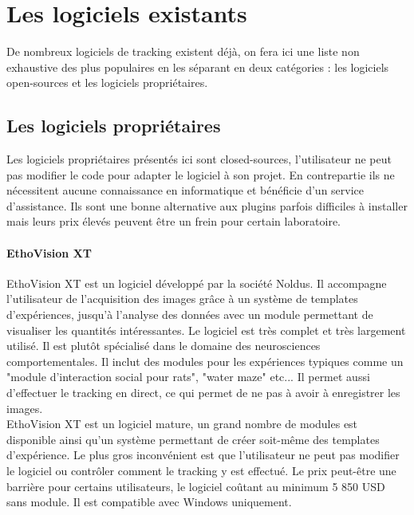 	\section{Les logiciels existants}
  De nombreux logiciels de tracking existent déjà, on fera ici une liste non exhaustive des plus populaires en les séparant en deux catégories : les logiciels open-sources et les logiciels propriétaires.

  \subsection{Les logiciels propriétaires}
  Les logiciels propriétaires présentés ici sont closed-sources, l'utilisateur ne peut pas modifier le code pour adapter le logiciel à son projet. En contrepartie ils ne nécessitent aucune connaissance en informatique et bénéficie d'un service d'assistance. Ils sont une bonne alternative aux plugins parfois difficiles à installer mais leurs prix élevés peuvent être un frein pour certain laboratoire.
  
  \paragraph{EthoVision XT}
  EthoVision XT est un logiciel développé par la société Noldus. Il accompagne l'utilisateur de l'acquisition des images grâce à un système de templates d'expériences, jusqu'à l'analyse des données avec un module permettant de visualiser les quantités intéressantes. Le logiciel est très complet et très largement utilisé. Il est plutôt spécialisé dans le domaine des neurosciences comportementales. Il inclut des modules pour les expériences typiques comme un "module d'interaction social pour rats", "water maze" etc... Il permet aussi d'effectuer le tracking en direct, ce qui permet de ne pas à avoir à enregistrer les images.\\
  EthoVision XT est un logiciel mature, un grand nombre de modules est disponible ainsi qu'un système permettant de créer soit-même des templates d'expérience. Le plus gros inconvénient est que l'utilisateur ne peut pas modifier le logiciel ou contrôler comment le tracking y est effectué. Le prix peut-être une barrière pour certains utilisateurs, le logiciel coûtant au minimum 5 850 USD sans module. Il est compatible avec Windows uniquement.
  
